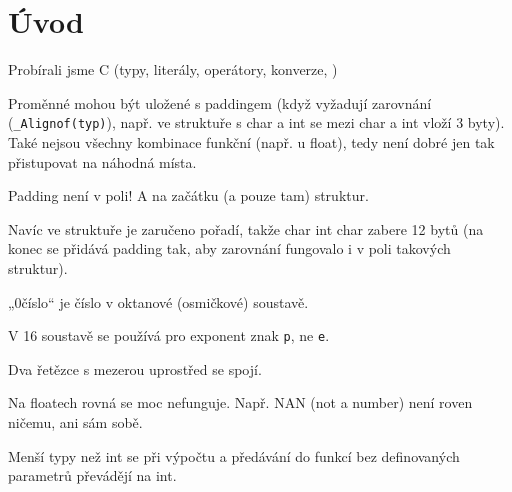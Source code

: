 \documentclass[12pt]{article}                   %
\begin{document}
\section{Úvod}
    \begin{poznamka}
        Probírali jsme C (typy, literály, operátory, konverze, )
    \end{poznamka}

    \begin{upozorneni}
        Proměnné mohou být uložené s paddingem (když vyžadují zarovnání (\verb|_Alignof(typ)|), např. ve struktuře s char a int se mezi char a int vloží 3 byty). Také nejsou všechny kombinace funkční (např. u float), tedy není dobré jen tak přistupovat na náhodná místa.

        Padding není v poli! A na začátku (a pouze tam) struktur.

        Navíc ve struktuře je zaručeno pořadí, takže char int char zabere 12 bytů (na konec se přidává padding tak, aby zarovnání fungovalo i v poli takových struktur).
    \end{upozorneni}

    \begin{upozorneni}
        „0číslo“ je číslo v oktanové (osmičkové) soustavě.

        V 16 soustavě se používá pro exponent znak \verb|p|, ne \verb|e|.

        Dva řetězce s mezerou uprostřed se spojí.
    \end{upozorneni}

    \begin{upozorneni}
        Na floatech rovná se moc nefunguje. Např. NAN (not a number) není roven ničemu, ani sám sobě.
    \end{upozorneni}

    \begin{upozorneni}
        Menší typy než int se při výpočtu a předávání do funkcí bez definovaných parametrů převádějí na int.
    \end{upozorneni}
\end{document}
